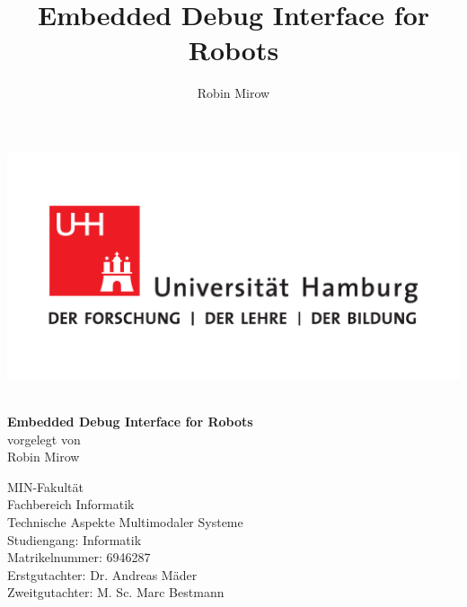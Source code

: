 \documentclass[12pt,DIV=13,BCOR=1.5cm,a4paper,twoside,bibliography=totoc,headings=small,headinclude,headsepline,numbers=noenddot]{scrbook}
\title{Embedded Debug Interface for Robots}
\author{Robin Mirow}
\begin{document}
\sloppy
{}
\pagestyle{empty}

\begin{titlepage}

	\sffamily

    \includegraphics[scale=0.3]{img/uhh_logo.pdf}
    \vspace*{2cm}\Large
    \begin{center}
        {\color{uhh-red}\textbf{}}
        \vspace*{2.0cm} \\
        {\LARGE \textbf{Embedded Debug Interface for Robots}}
        \vspace*{2.0cm} \\
        vorgelegt von \vspace*{0.4cm} \\
        Robin Mirow 
    \end{center}
    \vspace*{3.9cm}
    \noindent
    MIN-Fakultät \vspace*{0.4cm} \\
    Fachbereich Informatik \vspace*{0.4cm} \\
    Technische Aspekte Multimodaler Systeme \vspace*{0.4cm} \\
    Studiengang: Informatik \vspace*{0.4cm} \\
    Matrikelnummer: 6946287 \vspace*{0.8cm} \\
    Erstgutachter: 	Dr. Andreas Mäder \vspace*{0.4cm} \\
    Zweitgutachter: M. Sc. Marc Bestmann
\end{titlepage}
\restoregeometry
\end{document}
